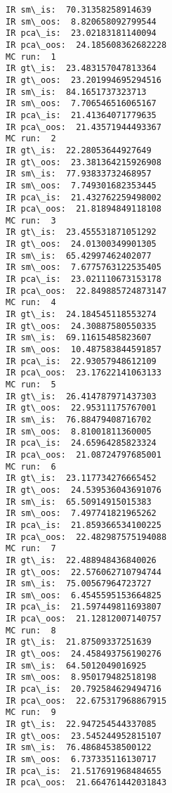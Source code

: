 \documentclass[11pt]{article}
\begin{document}
    \begin{Verbatim}[commandchars=\\\{\},fontsize=\footnotesize]
IR sm\_is:  70.31358258914639
IR sm\_oos:  8.820658092799544
IR pca\_is:  23.02183181140094
IR pca\_oos:  24.185608362682228
MC run:  1
IR gt\_is:  23.483157047813364
IR gt\_oos:  23.201994695294516
IR sm\_is:  84.1651737323713
IR sm\_oos:  7.706546516065167
IR pca\_is:  21.41364071779635
IR pca\_oos:  21.43571944493367
MC run:  2
IR gt\_is:  22.28053644927649
IR gt\_oos:  23.381364215926908
IR sm\_is:  77.93833732468957
IR sm\_oos:  7.749301682353445
IR pca\_is:  21.432762259498002
IR pca\_oos:  21.81894849118108
MC run:  3
IR gt\_is:  23.455531871051292
IR gt\_oos:  24.01300349901305
IR sm\_is:  65.42997462402077
IR sm\_oos:  7.6775763122535405
IR pca\_is:  23.021110673153178
IR pca\_oos:  22.849885724873147
MC run:  4
IR gt\_is:  24.184545118553274
IR gt\_oos:  24.30887580550335
IR sm\_is:  69.11615485823607
IR sm\_oos:  10.487583844591857
IR pca\_is:  22.93057948612109
IR pca\_oos:  23.17622141063133
MC run:  5
IR gt\_is:  26.414787971437303
IR gt\_oos:  22.95311175767001
IR sm\_is:  76.88479408716702
IR sm\_oos:  8.81001811360005
IR pca\_is:  24.65964285823324
IR pca\_oos:  21.08724797685001
MC run:  6
IR gt\_is:  23.117734276665452
IR gt\_oos:  24.539536043691076
IR sm\_is:  65.50914915015383
IR sm\_oos:  7.497741821965262
IR pca\_is:  21.859366534100225
IR pca\_oos:  22.482987575194088
MC run:  7
IR gt\_is:  22.488948436840026
IR gt\_oos:  22.576062710794744
IR sm\_is:  75.00567964723727
IR sm\_oos:  6.4545595153664825
IR pca\_is:  21.597449811693807
IR pca\_oos:  21.12812007140757
MC run:  8
IR gt\_is:  21.87509337251639
IR gt\_oos:  24.458493756190276
IR sm\_is:  64.5012049016925
IR sm\_oos:  8.950179482518198
IR pca\_is:  20.792584629494716
IR pca\_oos:  22.675317968867915
MC run:  9
IR gt\_is:  22.947254544337085
IR gt\_oos:  23.545244952815107
IR sm\_is:  76.48684538500122
IR sm\_oos:  6.737335116130717
IR pca\_is:  21.517691968484655
IR pca\_oos:  21.664761442031843

    \end{Verbatim}
\end{document}
